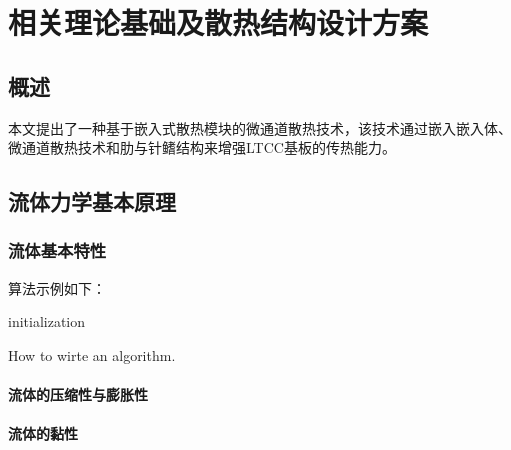 \chapter{相关理论基础及散热结构设计方案}\label{ch:2}

\section{概述}
本文提出了一种基于嵌入式散热模块的微通道散热技术，该技术通过嵌入嵌入体、微通道散热技术和肋与针鳍结构来增强LTCC基板的传热能力。

\section{流体力学基本原理}

\subsection{流体基本特性}

\noindent 算法示例如下：

\begin{algorithm}[H]
    initialization\;
    \caption{How to wirte an algorithm.}
\end{algorithm}

\subsubsection{流体的压缩性与膨胀性}

\subsubsection{流体的黏性}

